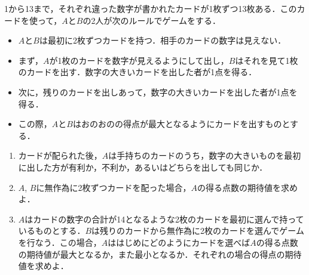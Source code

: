 \documentclass[../../main.tex]{subfiles}
\begin{document}
1から13まで，それぞれ違った数字が書かれたカードが1枚ずつ13枚ある．このカードを使って，$A$と$B$の2人が次のルールでゲームをする．
\begin{itemize}
  \item $A$と$B$は最初に2枚ずつカードを持つ．相手のカードの数字は見えない．
  \item まず，$A$が1枚のカードを数字が見えるようにして出し，$B$はそれを見て1枚のカードを出す．数字の大きいカードを出した者が1点を得る．
  \item 次に，残りのカードを出しあって，数字の大きいカードを出した者が1点を得る．
  \item この際，$A$と$B$はおのおのの得点が最大となるようにカードを出すものとする．
\end{itemize}

\begin{enumerate}
  \item カードが配られた後，$A$は手持ちのカードのうち，数字の大きいものを最初に出した方が有利か，不利か，あるいはどちらを出しても同じか．
  \item $A$, $B$に無作為に2枚ずつカードを配った場合，$A$の得る点数の期待値を求めよ．
  \item $A$はカードの数字の合計が14となるような2枚のカードを最初に選んで持っているものとする．$B$は残りのカードから無作為に2枚のカードを選んでゲームを行なう．この場合，$A$ははじめにどのようにカードを選べば$A$の得る点数の期待値が最大となるか，また最小となるか．それぞれの場合の得点の期待値を求めよ．
\end{enumerate}
\end{document}
